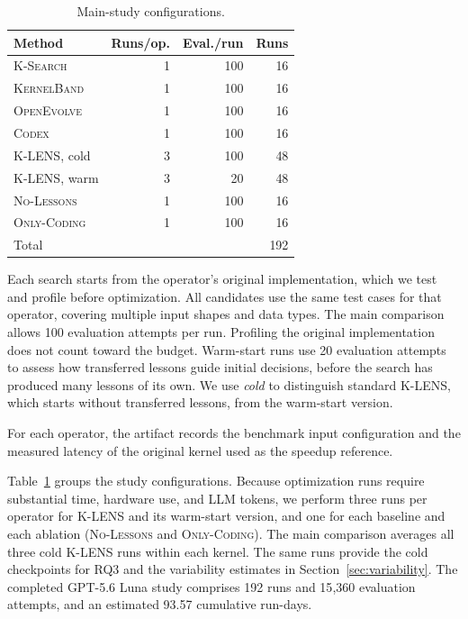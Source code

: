 \documentclass[acmsmall,screen,review,anonymous,nonacm]{acmart}
\newcommand{\klens}{\textsc{K-LENS}\xspace}
\newcommand{\ksearch}{\textsc{K-Search}\xspace}
\newcommand{\kernelband}{\textsc{KernelBand}\xspace}
\newcommand{\openevolve}{\textsc{OpenEvolve}\xspace}
\newcommand{\standardcodex}{\textsc{Codex}\xspace}
\newcommand{\nolessons}{\textsc{No-Lessons}\xspace}
\newcommand{\onlycodinglessons}{\textsc{Only-Coding}\xspace}
\newcommand{\numprofiles}{100\xspace}
\newcommand{\numruns}{192\xspace}
\newcommand{\numtotalprofiles}{15{,}360\xspace}
\begin{document}
\begin{table}
 \centering\footnotesize
 \caption{Main-study configurations.}
 \label{tab:study-size}
 \setlength{\tabcolsep}{3pt}
 \begin{tabular}{lrrr}
 \toprule
 Method & Runs/op. & Eval./run & Runs \\
 \midrule
 \ksearch & 1 & 100 & 16 \\
 \kernelband & 1 & 100 & 16 \\
 \openevolve & 1 & 100 & 16 \\
 \standardcodex & 1 & 100 & 16 \\
 \midrule
 \klens, cold & 3 & 100 & 48 \\
 \klens, warm & 3 & 20 & 48 \\
 \nolessons & 1 & 100 & 16 \\
 \onlycodinglessons & 1 & 100 & 16 \\
 \midrule
 Total & & & \numruns \\
 \bottomrule
 \end{tabular}
\end{table}

Each search starts from the operator's original implementation, which we test and profile before
optimization. All candidates use the same test cases for that operator, covering multiple input shapes and data types. The main comparison allows
\numprofiles evaluation attempts per run. Profiling the original implementation does not count toward
the budget.
Warm-start runs use 20 evaluation attempts to assess how transferred lessons guide initial decisions,
before the search has produced many lessons of its own.
We use \emph{cold} to distinguish standard \klens, which starts without transferred lessons,
from the warm-start version.


For each operator, the artifact records the benchmark input configuration and the measured latency of
the original kernel used as the speedup reference.

Table~\ref{tab:study-size} groups the study configurations.
Because optimization runs require substantial time, hardware use, and LLM tokens, we perform three
runs per operator for \klens and its warm-start version, and one for each baseline
and each ablation (\nolessons and \onlycodinglessons).
The main comparison averages all three cold \klens runs within each kernel.
The same runs provide the cold checkpoints for RQ3 and the variability estimates
in Section~\ref{sec:variability}. The completed GPT-5.6 Luna
study comprises \numruns runs and \numtotalprofiles evaluation attempts, and an estimated 93.57 cumulative run-days.
\end{document}
